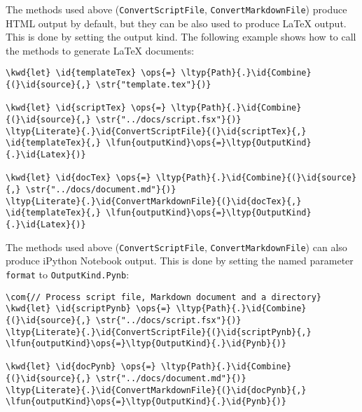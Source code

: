 \documentclass{article}
\newcommand{\id}[1]{\textcolor{black}{#1}}
\newcommand{\com}[1]{\textcolor{officegreen}{#1}}
\newcommand{\kwd}[1]{\textcolor{navy}{#1}}
\newcommand{\ops}[1]{\textcolor{purple}{#1}}
\newcommand{\str}[1]{\textcolor{olive}{#1}}
\begin{document}
The methods used above (\texttt{ConvertScriptFile}, \texttt{ConvertMarkdownFile})
produce HTML output by default, but they can be also used to produce LaTeX output. This is done
by setting the output kind. The following
example shows how to call the methods to generate LaTeX documents:
\begin{Verbatim}[commandchars=\\\{\}]
\kwd{let} \id{templateTex} \ops{=} \ltyp{Path}{.}\id{Combine}{(}\id{source}{,} \str{"template.tex"}{)}

\kwd{let} \id{scriptTex} \ops{=} \ltyp{Path}{.}\id{Combine}{(}\id{source}{,} \str{"../docs/script.fsx"}{)}
\ltyp{Literate}{.}\id{ConvertScriptFile}{(}\id{scriptTex}{,} \id{templateTex}{,} \lfun{outputKind}\ops{=}\ltyp{OutputKind}{.}\id{Latex}{)}

\kwd{let} \id{docTex} \ops{=} \ltyp{Path}{.}\id{Combine}{(}\id{source}{,} \str{"../docs/document.md"}{)}
\ltyp{Literate}{.}\id{ConvertMarkdownFile}{(}\id{docTex}{,} \id{templateTex}{,} \lfun{outputKind}\ops{=}\ltyp{OutputKind}{.}\id{Latex}{)}
\end{Verbatim}



The methods used above (\texttt{ConvertScriptFile}, \texttt{ConvertMarkdownFile})
can also produce iPython Notebook output. This is done
by setting the named parameter \texttt{format} to \texttt{OutputKind.Pynb}:
\begin{Verbatim}[commandchars=\\\{\}]
\com{// Process script file, Markdown document and a directory}
\kwd{let} \id{scriptPynb} \ops{=} \ltyp{Path}{.}\id{Combine}{(}\id{source}{,} \str{"../docs/script.fsx"}{)}
\ltyp{Literate}{.}\id{ConvertScriptFile}{(}\id{scriptPynb}{,} \lfun{outputKind}\ops{=}\ltyp{OutputKind}{.}\id{Pynb}{)}

\kwd{let} \id{docPynb} \ops{=} \ltyp{Path}{.}\id{Combine}{(}\id{source}{,} \str{"../docs/document.md"}{)}
\ltyp{Literate}{.}\id{ConvertMarkdownFile}{(}\id{docPynb}{,} \lfun{outputKind}\ops{=}\ltyp{OutputKind}{.}\id{Pynb}{)}
\end{Verbatim}
\end{document}
